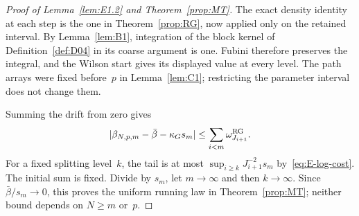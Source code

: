 \begin{proof}[Proof of Lemma~\ref{lem:E1.2} and Theorem~\ref{prop:MT}]
The exact density identity at each step is the one in Theorem~\ref{prop:RG}, now applied only on the retained interval. By Lemma~\ref{lem:B1}, integration of the block kernel of Definition~\ref{def:D04} in its coarse argument is one. Fubini therefore preserves the integral, and the Wilson start gives its displayed value at every level. The path arrays were fixed before~$p$ in Lemma~\ref{lem:C1}; restricting the parameter interval does not change them.

Summing the drift from zero gives
\begin{equation}\label{eq:E-running}
|\beta_{N,p,m}-\bar\beta-\kappa_G s_m|
\le\sum_{i<m}\omega_{J_{i+1}}^{\rm RG}.
\end{equation}
For a fixed splitting level~$k$, the tail is at most
$\sup_{i\ge k}J_{i+1}^{-2}s_m$ by~\eqref{eq:E-log-cost}. The initial sum is fixed. Divide by $s_m$, let $m\to\infty$ and then $k\to\infty$. Since $\bar\beta/s_m\to0$, this proves the uniform running law in Theorem~\ref{prop:MT}; neither bound depends on $N\ge m$ or~$p$.
\end{proof}

